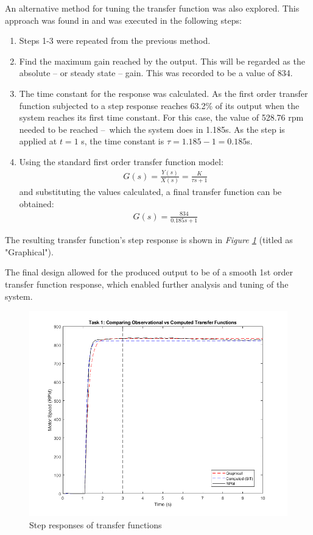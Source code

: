 \documentclass[11pt, onecolumn]{article}
\begin{document}
\par An alternative method for tuning the transfer function was also explored. This approach was found in \cite{umichControlTutorials} and was executed in the following steps:
\begin{enumerate}
    \item Steps 1-3 were repeated from the previous method.
    \item Find the maximum gain reached by the output. This will be regarded as the absolute – or steady state – gain. This was recorded to be a value of 834.
    \item The time constant for the response was calculated. As the first order transfer function subjected to a step response reaches 63.2\% of its output when the system reaches its first time constant. For this case, the value of 528.76 rpm needed to be reached – which the system does in 1.185s. As the step is applied at $t=1$ s, the time constant is $\tau = 1.185 - 1 = 0.185$s.
    \item Using the standard first order transfer function model:
          \begin{align*}
              G(s)=\frac{Y(s)}{X(s)}=\frac{K}{\tau s + 1}
          \end{align*}
          and substituting the values calculated, a final transfer function can be obtained:
          \begin{align*}
              G(s)=\frac{834}{0.185s + 1}
          \end{align*}
\end{enumerate}
\par The resulting transfer function's step response is shown in \textit{Figure \ref{fig:q1-graph}} (titled as "Graphical").
\\\par The final design allowed for the produced output to be of a smooth 1st order transfer function response, which enabled further analysis and tuning of the system.
\par
\begin{figure}[h!]
    \centering
    \includegraphics[width=\textwidth]{q1-graphs.png}
    \caption{Step responses of transfer functions }
    \label{fig:q1-graph}
\end{figure}
\end{document}
